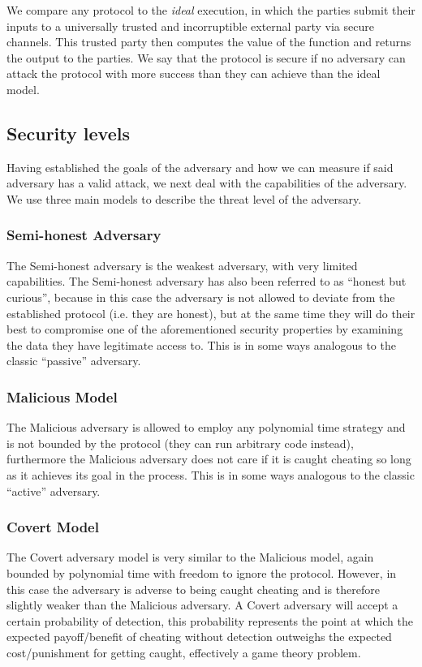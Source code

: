 \documentclass[a4paper,10pt]{article}
\begin{document}
			We compare any protocol to the \emph{ideal} execution, in which the parties submit their inputs to a universally trusted and incorruptible external party via secure channels. This trusted party then computes the value of the function and returns the output to the parties. We say that the protocol is secure if no adversary can attack the protocol with more success than they can achieve than the ideal model.


		\subsection{Security levels}\label{sub:securityLevels}
			Having established the goals of the adversary and how we can measure if said adversary has a valid attack, we next deal with the capabilities of the adversary. We use three main models to describe the threat level of the adversary.

			\subsubsection{Semi-honest Adversary}
				The Semi-honest adversary is the weakest adversary, with very limited capabilities. The Semi-honest adversary has also been referred to as ``honest but curious'', because in this case the adversary is not allowed to deviate from the established protocol (i.e. they are honest), but at the same time they will do their best to compromise one of the aforementioned security properties by examining the data they have legitimate access to. This is in some ways analogous to the classic ``passive'' adversary.

			\subsubsection{Malicious Model}
				The Malicious adversary is allowed to employ any polynomial time strategy and is not bounded by the protocol (they can run arbitrary code instead), furthermore the Malicious adversary does not care if it is caught cheating so long as it achieves its goal in the process. This is in some ways analogous to the classic ``active'' adversary.

			\subsubsection{Covert Model}
				The Covert adversary model is very similar to the Malicious model, again bounded by polynomial time with freedom to ignore the protocol. However, in this case the adversary is adverse to being caught cheating and is therefore slightly weaker than the Malicious adversary. A Covert adversary will accept a certain probability of detection, this probability represents the point at which the expected payoff/benefit of cheating without detection outweighs the expected cost/punishment for getting caught, effectively a game theory problem.\\
\end{document}
